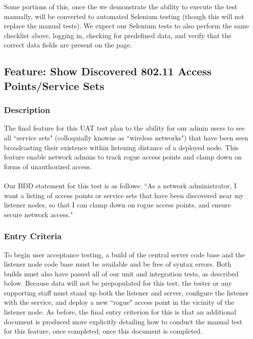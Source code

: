 \documentclass[]{article}
\begin{document}
	Some portions of this, once the we demonstrate the ability to execute the test manually, will be converted to automated
	Selenium testing (though this will not replace the manual tests). We expect our Selenium tests to also perform the
	same checklist above, logging in, checking for predefined data, and verify that the correct data fields are present on
	the page.
	
	\subsection{Feature: Show Discovered 802.11 Access Points/Service Sets}
	\subsubsection{Description}	
    The final feature for this UAT test plan to the ability for our admin users to see all ``service sets" (colloquially knowns
    as ``wireless networks") that have been seen broadcasting their existence within listening distance of a deployed node. This
    feature enable network admins to track rogue access points and clamp down on forms of unauthorized access.
	
	\paragraph{}
	Our BDD statement for this test is as follows: ``As a network administrator, I want a listing of access points or service
	sets that have been discovered near my listener nodes, so that I can clamp down on rogue access points, and ensure secure
	network access."
	
    \subsubsection{Entry Criteria}	
    To begin user acceptance testing, a build of the central server code base and the listener node code base
    must be available and be free of syntax errors. Both builds must also have passed all of our unit and integration tests,
    as described below. Because data will not be prepopulated for this test, the tester or any supporting staff must
    stand up both the listener and server, configure the listener with the service, and deploy a new
    ``rogue" access point in the vicinity of the listener node.  As before, the final entry criterion for this is that an 
    additional document is produced more explicitly detailing how to conduct the manual test for this feature, once completed;
    once this document is completed.
     
\end{document}
